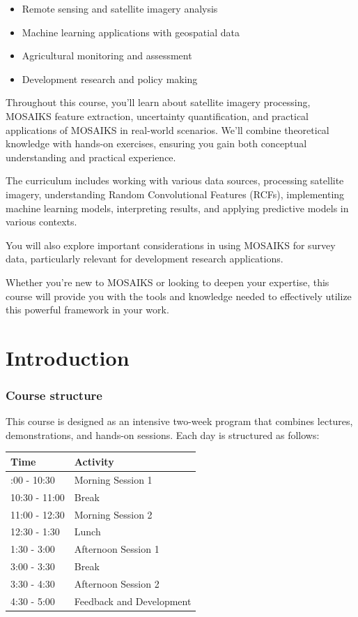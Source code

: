 \documentclass[
  letterpaper,
  DIV=11,
  numbers=noendperiod]{scrreprt}
\providecommand{\tightlist}{%
  \setlength{\itemsep}{0pt}\setlength{\parskip}{0pt}}\usepackage{longtable,booktabs,array}
\begin{document}
\begin{itemize}
\tightlist
\item
  Remote sensing and satellite imagery analysis
\item
  Machine learning applications with geospatial data
\item
  Agricultural monitoring and assessment
\item
  Development research and policy making
\end{itemize}

Throughout this course, you'll learn about satellite imagery processing,
MOSAIKS feature extraction, uncertainty quantification, and practical
applications of MOSAIKS in real-world scenarios. We'll combine
theoretical knowledge with hands-on exercises, ensuring you gain both
conceptual understanding and practical experience.

The curriculum includes working with various data sources, processing
satellite imagery, understanding Random Convolutional Features (RCFs),
implementing machine learning models, interpreting results, and applying
predictive models in various contexts.

You will also explore important considerations in using MOSAIKS for
survey data, particularly relevant for development research
applications.

Whether you're new to MOSAIKS or looking to deepen your expertise, this
course will provide you with the tools and knowledge needed to
effectively utilize this powerful framework in your work.

\part{Introduction}

\hypertarget{course-structure}{%
\section*{Course structure}\label{course-structure}}


This course is designed as an intensive two-week program that combines
lectures, demonstrations, and hands-on sessions. Each day is structured
as follows:

\begin{longtable}[]{@{}ll@{}}
\toprule\noalign{}
\textbf{Time} & \textbf{Activity} \\
\midrule\noalign{}
\endhead
\bottomrule\noalign{}
\endlastfoot
9:00 - 10:30 & Morning Session 1 \\
10:30 - 11:00 & Break \\
11:00 - 12:30 & Morning Session 2 \\
12:30 - 1:30 & Lunch \\
1:30 - 3:00 & Afternoon Session 1 \\
3:00 - 3:30 & Break \\
3:30 - 4:30 & Afternoon Session 2 \\
4:30 - 5:00 & Feedback and Development \\
\end{longtable}
\end{document}

